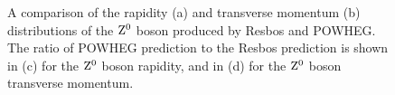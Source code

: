 \documentclass{cmspaper}
\begin{document}
\begin{figure}[htb]
  \begin{center}
    \caption{A comparison of the rapidity (a) and transverse momentum (b) distributions of the $\mathrm{Z^0}$ boson produced by Resbos and POWHEG. The ratio of POWHEG prediction to the Resbos prediction is shown in (c) for the $\mathrm{Z^0}$ boson rapidity, and in (d) for the $\mathrm{Z^0}$ boson transverse momentum.}
    \label{fig:ResbosVsPowheg_ZRapidityPt}
  \end{center}
\end{figure}
\end{document}
